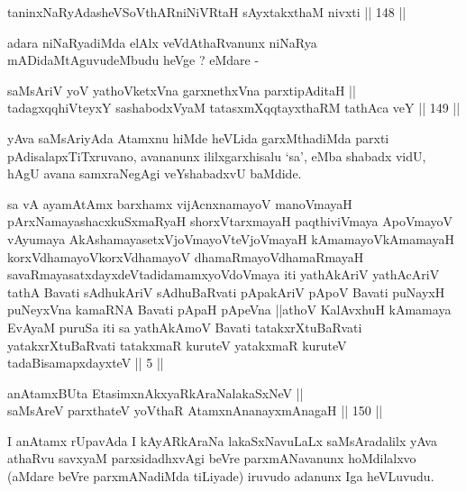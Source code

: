\begin{shl}
taninxNaRyAdasheVSoV\s thAR\s niNiVRtaH sAyxtakxthaM nivxti \hfill || 148 ||  
\end{shl}

\begin{artha}
adara niNaRyadiMda elAlx veVdAthaRvanunx niNaRya mADidaMtAguvudeMbudu
heVge ? eMdare -
\end{artha}

\begin{shl}
saMsAriV yoV yathoVketxVna garxnethxVna parxtipAditaH || \\
tadagxqqhiVteyxY sashabodxV\s yaM tatasxmXqqtayxthaRM tathAca veY \hfill || 149 ||  
\end{shl}

\begin{artha}
yAva saMsAriyAda Atamxnu hiMde heVLida garxMthadiMda parxti
pAdisalapxTiTxruvano, avananunx ililxgarxhisalu `sa', eMba shabadx
vidU, hAgU avana samxraNegAgi veYshabadxvU baMdide.
\end{artha}

\begin{shl}
sa vA ayamAtAmx barxhamx vijAcnxnamayoV manoVmayaH pArxNamayashacxkuSxmaRyaH shorxVtarxmayaH paqthiviVmaya ApoVmayoV vAyumaya AkAshamayasetxVjoVmayoV\s teVjoVmayaH kAmamayoV\s kAmamayaH korxVdhamayoV\s korxVdhamayoV dhamaRmayoV\s dhamaRmayaH savaRmayasatxdayxdeVtadidamamxyoV\s doVmaya iti yathAkAriV yathAcAriV tathA Bavati sAdhukAriV sAdhuBaRvati pApakAriV pApoV Bavati puNayxH puNeyxVna kamaRNA Bavati pApaH pApeVna ||athoV KalAvxhuH kAmamaya EvAyaM puruSa iti sa yathAkAmoV Bavati tatakxrXtuBaRvati yatakxrXtuBaRvati tatakxmaR kuruteV yatakxmaR kuruteV tadaBisamapxdayxteV || 5 ||
\end{shl}

\begin{shl}
anAtamxBUta EtasimxnAkxyaRkAraNalakaSxNeV || \\
saMsAreV parxthateV yoV\s thaR AtamxnA\s nanayxmAnagaH \hfill || 150 ||  
\end{shl}

\begin{artha}
I anAtamx rUpavAda I kAyARkAraNa lakaSxNavuLaLx saMsAradalilx yAva
athaRvu savxyaM parxsidadhxvAgi beVre parxmANavanunx hoMdilalxvo
(aMdare beVre parxmANadiMda tiLiyade) iruvudo adanunx Iga heVLuvudu.
\end{artha}

